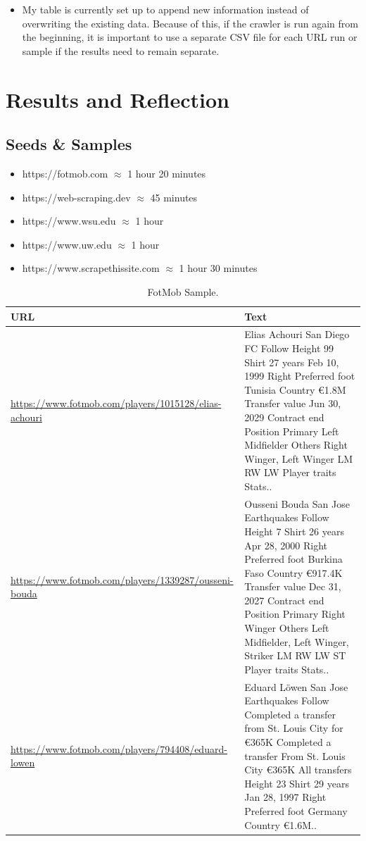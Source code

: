 \documentclass{article}
\begin{document}
\begin{itemize}
    \item My table is currently set up to append new information instead of overwriting the existing data. Because of this, if the crawler is run again from the beginning, it is important to use a separate CSV file for each URL run or sample if the results need to remain separate.
\end{itemize}
\vspace{0.5em}

\section{Results and Reflection}

\vspace{0.5em}

\subsection{Seeds \& Samples}
\begin{itemize}
    \item https://fotmob.com $\approx$ 1 hour 20 minutes
    \item https://web-scraping.dev $\approx$ 45 minutes
    \item https://www.wsu.edu $\approx$ 1 hour
    \item https://www.uw.edu $\approx$ 1 hour
    \item https://www.scrapethissite.com $\approx$ 1 hour 30 minutes
\end{itemize}


\begin{table}[h]
\centering
\begin{tabularx}{\textwidth}{|p{}|X|}
\hline
\textbf{URL} & \textbf{Text} \\ \hline

\url{https://www.fotmob.com/players/1015128/elias-achouri} &
Elias Achouri San Diego FC Follow Height 99 Shirt 27 years Feb 10, 1999 Right Preferred foot Tunisia Country €1.8M Transfer value Jun 30, 2029 Contract end Position Primary Left Midfielder Others Right Winger, Left Winger LM RW LW Player traits Stats.. \\ \hline

\url{https://www.fotmob.com/players/1339287/ousseni-bouda} &
Ousseni Bouda San Jose Earthquakes Follow Height 7 Shirt 26 years Apr 28, 2000 Right Preferred foot Burkina Faso Country €917.4K Transfer value Dec 31, 2027 Contract end Position Primary Right Winger Others Left Midfielder, Left Winger, Striker LM RW LW ST Player traits Stats.. \\ \hline

\url{https://www.fotmob.com/players/794408/eduard-lowen} &
Eduard Löwen San Jose Earthquakes Follow Completed a transfer from St. Louis City for €365K Completed a transfer From St. Louis City €365K All transfers Height 23 Shirt 29 years Jan 28, 1997 Right Preferred foot Germany Country €1.6M.. \\ \hline

\end{tabularx}
\caption{FotMob Sample.}
\end{table}
\end{document}
